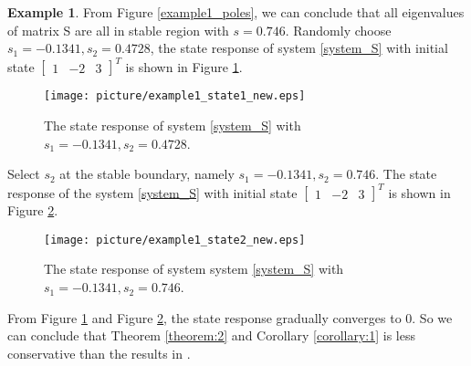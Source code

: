 \documentclass[]{interact}
\theoremstyle{plain}%
\theoremstyle{definition}
\newtheorem{example}[theorem]{Example}
\theoremstyle{remark}
\begin{document}
\begin{example}
    \par  From Figure \ref{example1_poles}, we can conclude that all eigenvalues of matrix S are all in stable region with $s = 0.746$. Randomly choose $s_1=  -0.1341 ,s_2 =  0.4728$, the state response of system \eqref{system_S} with initial state $\begin{bmatrix}1 & -2 & 3\end{bmatrix}^T$ is shown in Figure \ref{example1_state1}. 
    \begin{figure}[H]
    	\centering
    	\texttt{[image: picture/example1\_state1\_new.eps]}
    	\caption{The state response of system \eqref{system_S} with $s_1=  -0.1341 ,s_2 =  0.4728$.} 
    	\label{example1_state1} 
    \end{figure}
    Select $s_2$ at the stable boundary, namely $s_1 = -0.1341,s_2 =  0.746$. The state response of the system \eqref{system_S} with initial state $\begin{bmatrix}1 & -2 & 3\end{bmatrix}^T$ is shown in Figure \ref{example1_state2}.
    \begin{figure}[H]
    	\centering
    	\texttt{[image: picture/example1\_state2\_new.eps]}
    	\caption{The state response of system system \eqref{system_S} with $s_1=  -0.1341,s_2 =  0.746$.} 
    	\label{example1_state2} 
    \end{figure}
    \par From Figure \ref{example1_state1} and Figure \ref{example1_state2}, the state response gradually converges to 0. So we can conclude that Theorem \ref{theorem:2} and Corollary \ref{corollary:1} is less conservative than the results in \cite{Chen2015}. 
\end{example}
\end{document}

